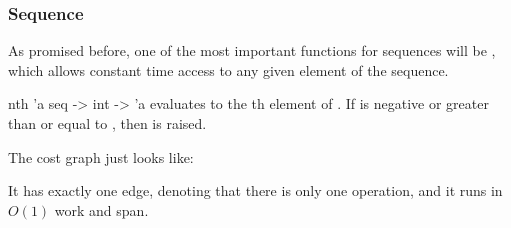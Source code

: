 \documentclass[aspectratio=169]{beamer}
\begin{document}
\begin{frame}[fragile]
  \frametitle{Sequence }

  As promised before, one of the most important functions for sequences
  will be , which allows constant time access to any given element
  of the sequence.

  \pause
  \vspace{\fill}

    \spec
      {nth}
      {'a seq -> int -> 'a}
      {}
      { evaluates to the th element of .
      If  is negative or greater than or equal to ,
      then  is raised.}

  \pause
  \vspace{\fill}

  \begin{center}
  \begin{minipage}{0.7\textwidth}
    The cost graph just looks like:

    \vspace{20pt}

    It has exactly one edge, denoting that there is only one operation, and
    it runs in $O(1)$ work and span.
  \end{minipage}
  \hfill
  \begin{minipage}{0.25\textwidth}
    \centering
  \end{minipage}
  \end{center}
\end{frame}
\end{document}
